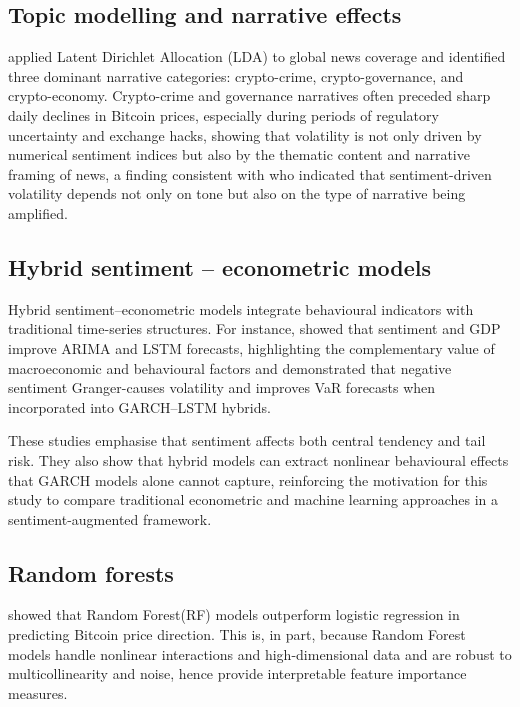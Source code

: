 \documentclass[12pt]{report}
\begin{document}
\subsection{Topic modelling and narrative effects}

\cite{coulter2022media} applied Latent Dirichlet Allocation (LDA) to global news coverage and identified three dominant narrative categories: crypto-crime, crypto-governance, and crypto-economy. Crypto-crime and governance narratives often preceded sharp daily declines in Bitcoin prices, especially during periods of regulatory uncertainty and exchange hacks, showing that volatility is not only driven by numerical sentiment indices but also by the thematic content and narrative framing of news, a finding consistent with 
\cite{sapkota2022newsbitcoin} who indicated that sentiment-driven volatility depends not only on tone but also on the type of narrative being amplified. 

\subsection{Hybrid sentiment -- econometric models}

Hybrid sentiment–econometric models integrate behavioural indicators with traditional time-series structures. For instance, \cite{kabo2025sentimenthybrid} showed that sentiment and GDP improve ARIMA and LSTM forecasts, highlighting the complementary value of macroeconomic and behavioural factors and \cite{leberegyed2025sentimentlstm} demonstrated that negative sentiment Granger-causes volatility and improves VaR forecasts when incorporated into GARCH–LSTM hybrids.

These studies emphasise that sentiment affects both central tendency and tail risk. They also show that hybrid models can extract nonlinear behavioural effects that GARCH models alone cannot capture, reinforcing the motivation for this study to compare traditional econometric and machine learning approaches in a sentiment-augmented framework.


\subsection{Random forests}

\cite{basher2022bitcoinRF} showed that Random Forest(RF) models outperform logistic regression in predicting Bitcoin price direction. This is, in part, because Random Forest models handle nonlinear interactions and high-dimensional data and are robust to multicollinearity and noise, hence provide interpretable feature importance measures.
\end{document}
